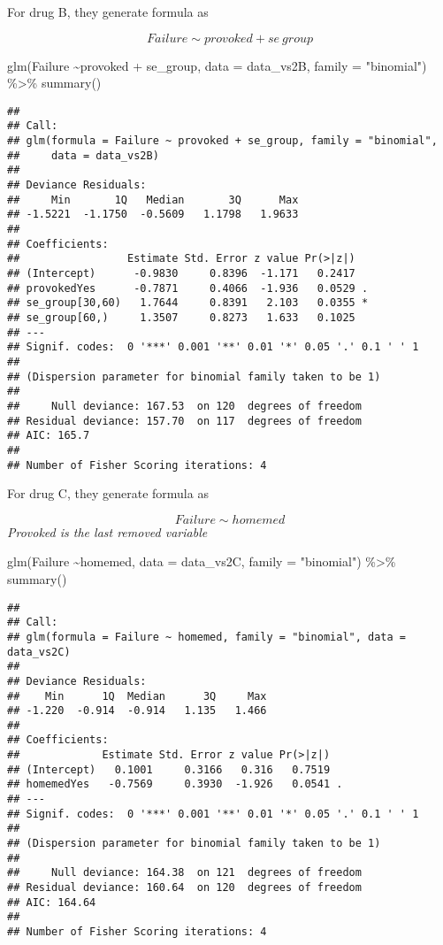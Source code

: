 \documentclass[
]{article}
\newenvironment{Shaded}{\begin{snugshade}}{\end{snugshade}}
\newcommand{\AttributeTok}[1]{\textcolor[rgb]{0.77,0.63,0.00}{#1}}
\newcommand{\FunctionTok}[1]{\textcolor[rgb]{0.00,0.00,0.00}{#1}}
\newcommand{\NormalTok}[1]{#1}
\newcommand{\SpecialCharTok}[1]{\textcolor[rgb]{0.00,0.00,0.00}{#1}}
\newcommand{\StringTok}[1]{\textcolor[rgb]{0.31,0.60,0.02}{#1}}
\begin{document}
For drug B, they generate formula as

\[Failure \sim provoked + se\ group\]

\begin{Shaded}
\begin{Highlighting}[]
\FunctionTok{glm}\NormalTok{(Failure }\SpecialCharTok{\textasciitilde{}}\NormalTok{provoked }\SpecialCharTok{+}\NormalTok{ se\_group, }\AttributeTok{data =}\NormalTok{ data\_vs2B, }\AttributeTok{family =} \StringTok{"binomial"}\NormalTok{) }\SpecialCharTok{\%\textgreater{}\%} \FunctionTok{summary}\NormalTok{()}
\end{Highlighting}
\end{Shaded}

\begin{verbatim}
## 
## Call:
## glm(formula = Failure ~ provoked + se_group, family = "binomial", 
##     data = data_vs2B)
## 
## Deviance Residuals: 
##     Min       1Q   Median       3Q      Max  
## -1.5221  -1.1750  -0.5609   1.1798   1.9633  
## 
## Coefficients:
##                 Estimate Std. Error z value Pr(>|z|)  
## (Intercept)      -0.9830     0.8396  -1.171   0.2417  
## provokedYes      -0.7871     0.4066  -1.936   0.0529 .
## se_group[30,60)   1.7644     0.8391   2.103   0.0355 *
## se_group[60,)     1.3507     0.8273   1.633   0.1025  
## ---
## Signif. codes:  0 '***' 0.001 '**' 0.01 '*' 0.05 '.' 0.1 ' ' 1
## 
## (Dispersion parameter for binomial family taken to be 1)
## 
##     Null deviance: 167.53  on 120  degrees of freedom
## Residual deviance: 157.70  on 117  degrees of freedom
## AIC: 165.7
## 
## Number of Fisher Scoring iterations: 4
\end{verbatim}

For drug C, they generate formula as

\[Failure \sim homemed\] \emph{Provoked is the last removed variable}

\begin{Shaded}
\begin{Highlighting}[]
\FunctionTok{glm}\NormalTok{(Failure }\SpecialCharTok{\textasciitilde{}}\NormalTok{homemed, }\AttributeTok{data =}\NormalTok{ data\_vs2C, }\AttributeTok{family =} \StringTok{"binomial"}\NormalTok{) }\SpecialCharTok{\%\textgreater{}\%} \FunctionTok{summary}\NormalTok{()}
\end{Highlighting}
\end{Shaded}

\begin{verbatim}
## 
## Call:
## glm(formula = Failure ~ homemed, family = "binomial", data = data_vs2C)
## 
## Deviance Residuals: 
##    Min      1Q  Median      3Q     Max  
## -1.220  -0.914  -0.914   1.135   1.466  
## 
## Coefficients:
##             Estimate Std. Error z value Pr(>|z|)  
## (Intercept)   0.1001     0.3166   0.316   0.7519  
## homemedYes   -0.7569     0.3930  -1.926   0.0541 .
## ---
## Signif. codes:  0 '***' 0.001 '**' 0.01 '*' 0.05 '.' 0.1 ' ' 1
## 
## (Dispersion parameter for binomial family taken to be 1)
## 
##     Null deviance: 164.38  on 121  degrees of freedom
## Residual deviance: 160.64  on 120  degrees of freedom
## AIC: 164.64
## 
## Number of Fisher Scoring iterations: 4
\end{verbatim}
\end{document}
